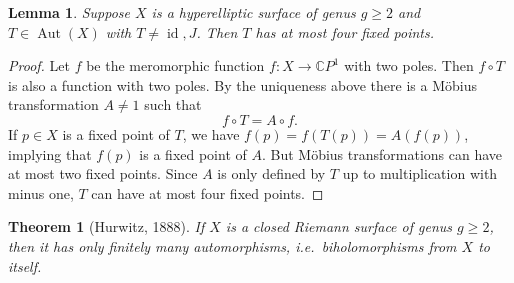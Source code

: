 \documentclass[a4paper]{article}
\newcommand{\CC}{\mathbb{C}}
\newcommand{\lra}{\longrightarrow}
\newcommand{\id}{\operatorname{id}}
\newcommand{\Aut}{\operatorname{Aut}}
\newtheorem*{thm}{Theorem}
\newtheorem*{lem}{Lemma}
\theoremstyle{definition}
\theoremstyle{remark}
\theoremstyle{remark}
\begin{document}
\begin{lem}
 Suppose $X$ is a hyperelliptic surface of genus $g\geq 2$ and $T\in\Aut(X)$ with $T\neq\id,J$. Then $T$ has at most four fixed points.
\end{lem}

\begin{proof}
  Let $f$ be the meromorphic function $f:X\lra\CC P^1$ with two poles. Then $f\circ T$ is also a function with two poles. By the uniqueness above there is a Möbius transformation $A\neq1$ such that
  \begin{equation*}
    f\circ T=A\circ f.
  \end{equation*}
If $p\in X$ is a fixed point of $T$, we have $f(p)=f(T(p))=A(f(p))$, implying that $f(p)$ is a fixed point of $A$. But Möbius transformations can have at most two fixed points. Since $A$ is only defined by $T$ up to multiplication with minus one, $T$ can have at most four fixed points.
\end{proof}

\begin{thm}[Hurwitz, 1888]
  If $X$ is a closed Riemann surface of genus $g\geq 2$, then it has only finitely many automorphisms, i.e.\ biholomorphisms from $X$ to itself.
\end{thm}
\end{document}

